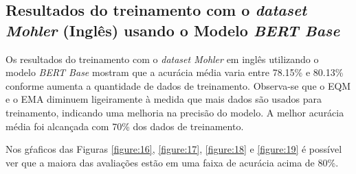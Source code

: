 \subsection{Resultados do treinamento com o \textit{dataset Mohler} (Inglês) usando o Modelo \textit{BERT Base}}

Os resultados do treinamento com o \textit{dataset Mohler} em inglês utilizando o modelo \textit{BERT Base} mostram que a acurácia média varia entre 78.15\% e 80.13\% conforme aumenta a quantidade de dados de treinamento. Observa-se que o EQM e o EMA diminuem ligeiramente à medida que mais dados são usados para treinamento, indicando uma melhoria na precisão do modelo. A melhor acurácia média foi alcançada com 70\% dos dados de treinamento.

\begin{table}[h!]
\centering
{}
\caption{Resultados de Regressão para Diferentes Percentuais de Treino com o \textit{dataset Mohler} (Inglês) usando o Modelo \textit{BERT Base}}
\label{tab:resultados_regressao_ingles_base}
\end{table}

Nos gŕaficos das Figuras \ref{figure:16}, \ref{figure:17}, \ref{figure:18} e \ref{figure:19} é possível ver que a maiora das avaliações estão em uma faixa de acurácia acima de 80\%.



\FloatBarrier


